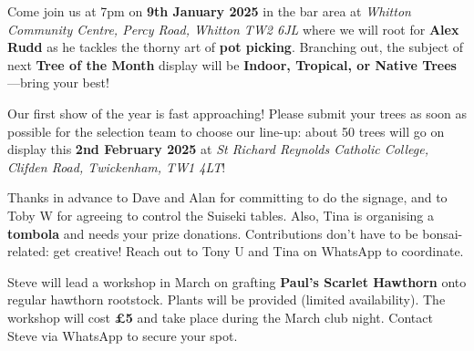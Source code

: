 \noindent
Come join us at 7pm on \textbf{9th January 2025} in the bar area at \emph{Whitton Community Centre, Percy Road, Whitton TW2 6JL} where we will root for \textbf{Alex Rudd} as he tackles the thorny art of \textbf{pot picking}.
Branching out, the subject of next \textbf{Tree of the Month} display will be \textbf{Indoor, Tropical, or Native Trees}---bring your best!
	
\noindent
Our first show of the year is fast approaching!
Please submit your trees as soon as possible for the selection team to choose our line\--up: about 50 trees will go on display this \textbf{2nd February 2025} at \emph{St Richard Reynolds Catholic College, Clifden Road, Twickenham, TW1 4LT}!
	
Thanks in advance to Dave and Alan for committing to do the signage, and to Toby W for agreeing to control the Suiseki tables.
Also, Tina is organising a \textbf{tombola} and needs your prize donations.
Contributions don't have to be bonsai\--related: get creative!
Reach out to Tony U and Tina on WhatsApp to coordinate.

\noindent
Steve will lead a workshop in March on grafting \textbf{Paul's Scarlet Hawthorn} onto regular hawthorn rootstock.
Plants will be provided (limited availability).
The workshop will cost \textbf{£5} and take place during the March club night.
Contact Steve via WhatsApp to secure your spot.

\closearticle
